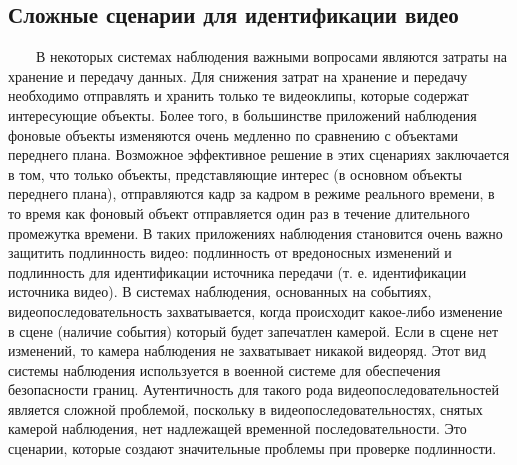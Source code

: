 \documentclass[12pt]{article}
\begin{document}
    \subsection{Сложные сценарии для идентификации видео}
        $\qquad$В некоторых системах наблюдения важными вопросами являются затраты на хранение и передачу данных. Для снижения затрат на хранение и передачу необходимо отправлять и хранить только те видеоклипы, которые содержат интересующие объекты. Более того, в большинстве приложений наблюдения фоновые объекты изменяются очень медленно по сравнению с объектами переднего плана. Возможное эффективное
        решение в этих сценариях заключается в том, что только объекты, представляющие
        интерес (в основном объекты переднего плана), отправляются кадр за кадром в режиме реального времени, в то время как фоновый объект отправляется один раз
        в течение длительного промежутка времени. В таких приложениях наблюдения
        становится очень важно защитить подлинность
        видео: подлинность от вредоносных изменений и
        подлинность для идентификации источника передачи (т. е.
        идентификации источника видео). В системах наблюдения, основанных на событиях, видеопоследовательность захватывается, когда происходит
        какое-либо изменение в сцене (наличие события)
        который будет запечатлен камерой. Если в сцене нет изменений, то камера наблюдения не
        захватывает никакой видеоряд. Этот вид системы наблюдения
        используется в военной системе для обеспечения безопасности границ. Аутентичность для такого рода видеопоследовательностей является
        сложной проблемой, поскольку
        в видеопоследовательностях, снятых камерой наблюдения, нет надлежащей временной последовательности.
        Это сценарии, которые создают значительные
        проблемы при проверке подлинности.
        
\end{document}
